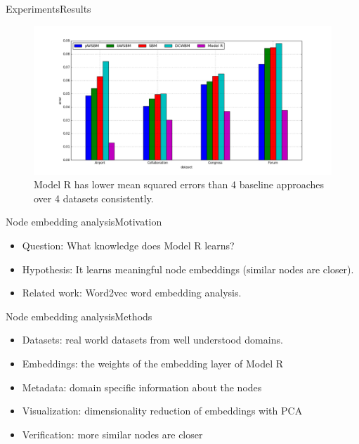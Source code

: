 \documentclass{beamer}
\begin{document}
\begin{frame}{Experiments}{Results}
	\begin{figure}[H]\centering
		\includegraphics[width=\textwidth]{link-weight-errors}
		\caption{
			Model R has lower mean squared errors than 4 baseline approaches over 4 datasets consistently.
		}
		\label{fig:errors}
	\end{figure}
\end{frame}

\begin{frame}{Node embedding analysis}{Motivation}
	\begin{itemize}
		\item Question: What knowledge does Model R learns?
		\item Hypothesis: It learns meaningful node embeddings (similar nodes are closer).
		\item Related work: Word2vec word embedding analysis.
	\end{itemize}
\end{frame}

\begin{frame}{Node embedding analysis}{Methods}
	\begin{itemize}
		\item Datasets: real world datasets from well understood domains.
		\item Embeddings: the weights of the embedding layer of Model R
		\item Metadata: domain specific information about the nodes
		\item Visualization: dimensionality reduction of embeddings with PCA
		\item Verification: more similar nodes are closer
	\end{itemize}
\end{frame}
\end{document}
